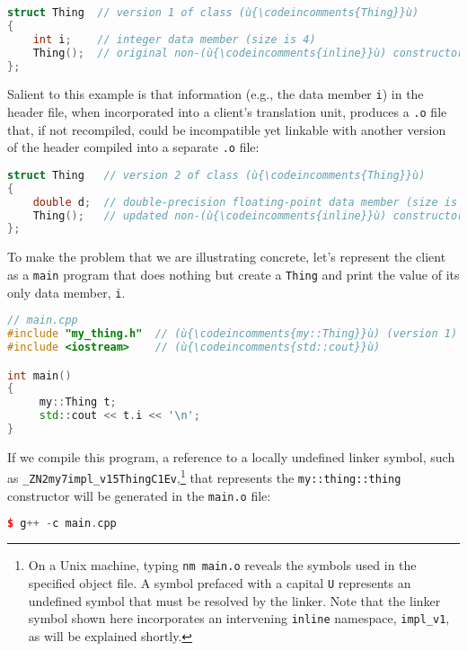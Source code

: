 \begin{lstlisting}[language=C++]
struct Thing  // version 1 of class (ù{\codeincomments{Thing}}ù)
{
    int i;    // integer data member (size is 4)
    Thing();  // original non-(ù{\codeincomments{inline}}ù) constructor (defined in (ù{\codeincomments{.cpp}}ù) file)
};
\end{lstlisting}

\noindent Salient to this example is that information (e.g., the data member
\texttt{i}) in the header file, when incorporated into a client's
translation unit, produces a \texttt{.o} file that, if not recompiled,
could be incompatible yet linkable with another version of the header
compiled into a separate \texttt{.o} file:

\begin{lstlisting}[language=C++]
struct Thing   // version 2 of class (ù{\codeincomments{Thing}}ù)
{
    double d;  // double-precision floating-point data member (size is 8)
    Thing();   // updated non-(ù{\codeincomments{inline}}ù) constructor (defined in (ù{\codeincomments{.cpp}}ù) file)
};
\end{lstlisting}

\noindent To make the problem that we are illustrating concrete, let's represent
the client as a \texttt{main} program that does nothing but create a
\texttt{Thing} and print the value of its only data member, \texttt{i}.

\begin{lstlisting}[language=C++]
// main.cpp
#include "my_thing.h"  // (ù{\codeincomments{my::Thing}}ù) (version 1)
#include <iostream>    // (ù{\codeincomments{std::cout}}ù)

int main()
{
     my::Thing t;
     std::cout << t.i << '\n';
}
\end{lstlisting}

\noindent If we compile this program, a reference to a locally undefined linker
symbol, such as
\texttt{\_ZN2my7impl\_v15ThingC1Ev},{\cprotect\footnote{On a Unix
machine, typing \texttt{nm}~\texttt{main.o} reveals the symbols used
in the specified object file. A symbol prefaced with a capital
\texttt{U} represents an undefined symbol that must be resolved by the
linker. Note that the linker symbol shown here incorporates an
intervening \texttt{inline} namespace, \texttt{impl\_v1}, as will be
  explained shortly.}} that represents the \texttt{my::thing::thing}
constructor will be generated in the \texttt{main.o} file:

\begin{lstlisting}[language=C++]
$ g++ -c main.cpp
\end{lstlisting}

